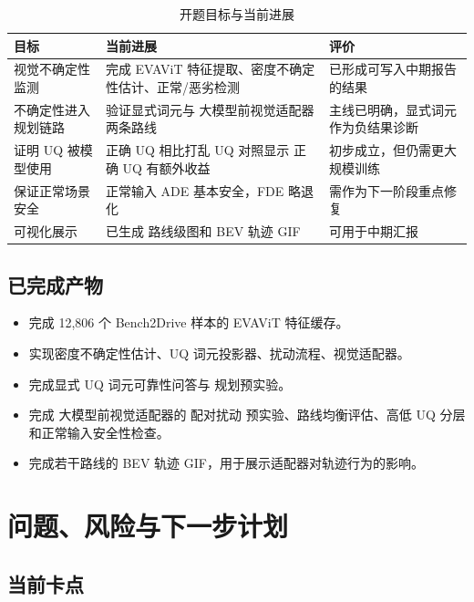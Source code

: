 \documentclass[12pt, a4paper]{ctexart}
\begin{document}
\begin{table}[H]
\centering
\caption{开题目标与当前进展}
\begin{tabular}{p{4.0cm}p{5.4cm}p{4.4cm}}
\toprule
\textbf{目标} & \textbf{当前进展} & \textbf{评价} \\
\midrule
视觉不确定性监测 & 完成 EVAViT 特征提取、密度不确定性估计、正常/恶劣检测 & 已形成可写入中期报告的结果 \\
不确定性进入规划链路 & 验证显式词元与 大模型前视觉适配器两条路线 & 主线已明确，显式词元作为负结果诊断 \\
证明 UQ 被模型使用 & 正确 UQ 相比打乱 UQ 对照显示 正确 UQ 有额外收益 & 初步成立，但仍需更大规模训练 \\
保证正常场景安全 & 正常输入 ADE 基本安全，FDE 略退化 & 需作为下一阶段重点修复 \\
可视化展示 & 已生成 路线级图和 BEV 轨迹 GIF & 可用于中期汇报 \\
\bottomrule
\end{tabular}
\end{table}

\subsection{已完成产物}

\begin{itemize}[leftmargin=2em]
    \item 完成 12,806 个 Bench2Drive 样本的 EVAViT 特征缓存。
    \item 实现密度不确定性估计、UQ 词元投影器、扰动流程、视觉适配器。
    \item 完成显式 UQ 词元可靠性问答与 规划预实验。
    \item 完成 大模型前视觉适配器的 配对扰动 预实验、路线均衡评估、高低 UQ 分层和正常输入安全性检查。
    \item 完成若干路线的 BEV 轨迹 GIF，用于展示适配器对轨迹行为的影响。
\end{itemize}

\section{问题、风险与下一步计划}

\subsection{当前卡点}
\end{document}
